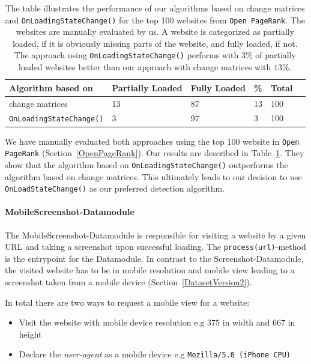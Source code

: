 \begin{table}[]
	\centering
	\begin{tabularx}{\textwidth}{l l l l l l}
		Algorithm based on & Partially Loaded & Fully Loaded & \%  & Total \\ \hline \hline
		change matrices & 13 & 87 & 13 & 100 \\ \hline
		\texttt{OnLoadingStateChange()} & 3 &  97 & 3 & 100
	\end{tabularx}
	\caption[Performance of Algorithms for Detection of Website Finished Loading]{The table illustrates the performance of our algorithms based on change matrices and \texttt{OnLoadingStateChange()} for the top 100 websites from \texttt{Open PageRank}. The websites are manually evaluated by us. A website is categorized as partially loaded, if it is obviously missing parts of the website, and fully loaded, if not. The approach using \texttt{OnLoadingStateChange()} performs with $3\%$ of partially loaded websites better than our approach with change matrices with $13\%$. }
	\label{table_compare_algorithm_screenshot}
\end{table}

We have manually evaluated both approaches using the top 100 website in \texttt{Open PageRank} (Section~\ref{OpenPageRank}). Our results are described in Table~\ref{table_compare_algorithm_screenshot}. They show that the algorithm based on \texttt{OnLoadingStateChange()} outperforms the algorithm based on change matrices. This ultimately leads to our decision to use \texttt{OnLoadStateChange()} as our preferred detection algorithm.

\paragraph*{MobileScreenshot-Datamodule}
\label{datacrawler_mobilescreenshot_datamodule}
The MobileScreenshot-Datamodule is responsible for visiting a website by a given URL and taking a screenshot upon successful loading. The \texttt{process(url)}-method is the entrypoint for the Datamodule. In contrast to the Screenshot-Datamodule, the visited website has to be in mobile resolution and mobile view leading to a screenshot taken from a mobile device (Section~\ref{DatasetVersion2}).

In total there are two ways to request a mobile view for a website:

\begin{itemize}
	\item Visit the website with mobile device resolution e.g $375$ in width and $667$ in height
	\item Declare the \textit{user-agent} as a mobile device e.g  \texttt{Mozilla/5.0 (iPhone CPU)}
\end{itemize}


